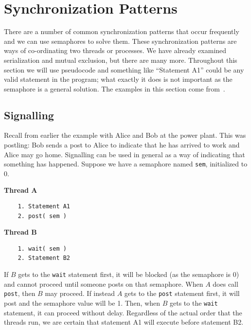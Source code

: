 




\section*{Synchronization Patterns}

There are a number of common synchronization patterns that occur frequently and we can use semaphores to solve them. These synchronization patterns are ways of co-ordinating two threads or processes. We have already examined serialization and mutual exclusion, but there are many more. Throughout this section we will use pseudocode and something like ``Statement A1'' could be any valid statement in the program; what exactly it does is not important as the semaphore is a general solution. The examples in this section come from~\cite{lbs}.

\subsection*{Signalling}
Recall from earlier the example with Alice and Bob at the power plant. This was postling: Bob sends a post to Alice to indicate that he has arrived to work and Alice may go home. Signalling can be used in general as a way of indicating that something has happened. Suppose we have a semaphore named \texttt{sem}, initialized to 0.

\begin{multicols}{2}
\textbf{Thread A}\vspace{-2em}
  \begin{verbatim}
	1. Statement A1
	2. post( sem )
  \end{verbatim}
\columnbreak
\textbf{Thread B}\vspace{-2em}
  \begin{verbatim}
	1. wait( sem )
	2. Statement B2
  \end{verbatim}
\end{multicols}
\vspace{-2em}

If $B$ gets to the \texttt{wait} statement first, it will be blocked (as the semaphore is 0) and cannot proceed until someone posts on that semaphore. When $A$ does call \texttt{post}, then $B$ may proceed. If instead $A$ gets to the \texttt{post} statement first, it will post and the semaphore value will be 1. Then, when $B$ gets to the \texttt{wait} statement, it can proceed without delay. Regardless of the actual order that the threads run, we are certain that statement A1 will execute before statement B2.

